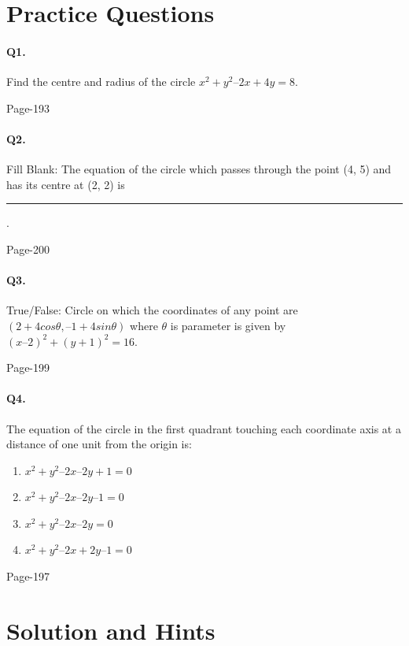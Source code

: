 \documentclass{article}
\begin{document}
\section*{Practice Questions}
\paragraph{Q1.}Find the centre and radius of the circle $x^2 + y^2 – 2x + 4y = 8$. 
\begin{flushright}
Page-193
\end{flushright}
\paragraph{Q2.}Fill Blank: The equation of the circle which passes through the point (4, 5) and has its centre at (2, 2) is \rule{3cm}{0.2mm}. 
\begin{flushright}
Page-200
\end{flushright}
\paragraph{Q3.}True/False: Circle on which the coordinates of any point are $(2 + 4 cos\theta, –1 +
4 sin\theta)$ where $\theta$ is parameter is given by $(x – 2)^2 + (y + 1)^2 = 16$. 
\begin{flushright}
Page-199
\end{flushright}
\paragraph{Q4.}The equation of the circle in the first quadrant touching each coordinate axis at a distance of one unit from the origin is:
\begin{enumerate}
    \item $x^2 + y^2 – 2x – 2y + 1= 0$
    \item $x^2 + y^2 – 2x – 2y – 1 = 0$
    \item $x^2+ y^2 – 2x – 2y = 0$
    \item $x^2 + y^2 – 2x + 2y – 1 = 0$
\end{enumerate}
\begin{flushright}
Page-197
\end{flushright}
\clearpage






\section*{Solution and Hints}
\end{document}
